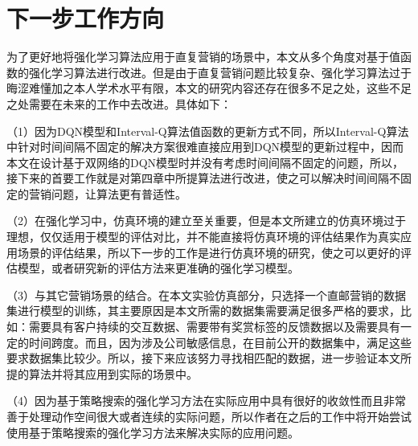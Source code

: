\section{下一步工作方向}
 为了更好地将强化学习算法应用于直复营销的场景中，本文从多个角度对基于值函数的强化学习算法进行改进。但是由于直复营销问题比较复杂、强化学习算法过于晦涩难懂加之本人学术水平有限，本文的研究内容还存在很多不足之处，这些不足之处需要在未来的工作中去改进。具体如下：

 （1）因为DQN模型和Interval-Q算法值函数的更新方式不同，所以Interval-Q算法中针对时间间隔不固定的解决方案很难直接应用到DQN模型的更新过程中，因而本文在设计基于双网络的DQN模型时并没有考虑时间间隔不固定的问题，所以，接下来的首要工作就是对第四章中所提算法进行改进，使之可以解决时间间隔不固定的营销问题，让算法更有普适性。

 （2）在强化学习中，仿真环境的建立至关重要，但是本文所建立的仿真环境过于理想，仅仅适用于模型的评估对比，并不能直接将仿真环境的评估结果作为真实应用场景的评估结果，所以下一步的工作是进行仿真环境的研究，使之可以更好的评估模型，或者研究新的评估方法来更准确的强化学习模型。

 （3）与其它营销场景的结合。在本文实验仿真部分，只选择一个直邮营销的数据集进行模型的训练，其主要原因是本文所需的数据集需要满足很多严格的要求，比如：需要具有客户持续的交互数据、需要带有奖赏标签的反馈数据以及需要具有一定的时间跨度。而且，因为涉及公司敏感信息，在目前公开的数据集中，满足这些要求数据集比较少。所以，接下来应该努力寻找相匹配的数据，进一步验证本文所提的算法并将其应用到实际的场景中。

 （4）因为基于策略搜索的强化学习方法在实际应用中具有很好的收敛性而且非常善于处理动作空间很大或者连续的实际问题，所以作者在之后的工作中将开始尝试使用基于策略搜索的强化学习方法来解决实际的应用问题。




